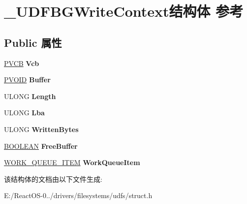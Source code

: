\hypertarget{struct___u_d_f_b_g_write_context}{}\section{\+\_\+\+U\+D\+F\+B\+G\+Write\+Context结构体 参考}
\label{struct___u_d_f_b_g_write_context}
\subsection*{Public 属性}
\begin{DoxyCompactItemize}
\item 
\mbox{\label{struct___u_d_f_b_g_write_context_a4144f0c1e4df28d52af652b5f92c75d9}} 
\hyperlink{struct_d_e_v_i_c_e___e_x_t_e_n_s_i_o_n}{P\+V\+CB} {\bfseries Vcb}
\item 
\mbox{\label{struct___u_d_f_b_g_write_context_ae93a2ff47c0b77787bc52bb03c8bc87d}} 
\hyperlink{interfacevoid}{P\+V\+O\+ID} {\bfseries Buffer}
\item 
\mbox{\label{struct___u_d_f_b_g_write_context_aed136143db01d0b4832f9b3433083c93}} 
U\+L\+O\+NG {\bfseries Length}
\item 
\mbox{\label{struct___u_d_f_b_g_write_context_adfe16e7554c49e45398f05515660f076}} 
U\+L\+O\+NG {\bfseries Lba}
\item 
\mbox{\label{struct___u_d_f_b_g_write_context_ae08c77d50cb3a00804658690869a895f}} 
U\+L\+O\+NG {\bfseries Written\+Bytes}
\item 
\mbox{\label{struct___u_d_f_b_g_write_context_a35a0482e8c8a55a4d89388e61b7bdaa8}} 
\hyperlink{_processor_bind_8h_a112e3146cb38b6ee95e64d85842e380a}{B\+O\+O\+L\+E\+AN} {\bfseries Free\+Buffer}
\item 
\mbox{\label{struct___u_d_f_b_g_write_context_ac969383cf0abc4ce8eeab6fc9a8d6b1e}} 
\hyperlink{struct___w_o_r_k___q_u_e_u_e___i_t_e_m}{W\+O\+R\+K\+\_\+\+Q\+U\+E\+U\+E\+\_\+\+I\+T\+EM} {\bfseries Work\+Queue\+Item}
\end{DoxyCompactItemize}


该结构体的文档由以下文件生成\+:\begin{DoxyCompactItemize}
\item 
E\+:/\+React\+O\+S-\/0../drivers/filesystems/udfs/struct.\+h\end{DoxyCompactItemize}

